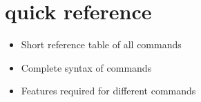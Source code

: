 \chapter{\es{} quick reference}
\label{chap:quickref}

\begin{itemize}
\item Short reference table of all commands
\item Complete syntax of \es{} commands
\item Features required for different commands
\end{itemize}

